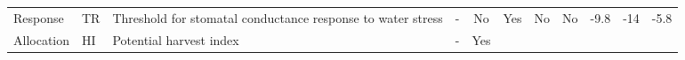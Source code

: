 \documentclass[a4paper]{article}
\begin{document}
\begin{longtable}[]{@{}llllccccrrr@{}}
\begin{minipage}[t]{0.08\columnwidth}
Response\strut
\end{minipage} & \begin{minipage}[t]{0.05\columnwidth}\raggedright\strut
TR\strut
\end{minipage} & \begin{minipage}[t]{0.19\columnwidth}\raggedright\strut
Threshold for stomatal conductance response to water stress\strut
\end{minipage} & \begin{minipage}[t]{0.06\columnwidth}\raggedright\strut
-\strut
\end{minipage} & \begin{minipage}[t]{0.06\columnwidth}\centering\strut
No\strut
\end{minipage} & \begin{minipage}[t]{0.08\columnwidth}\centering\strut
Yes\strut
\end{minipage} & \begin{minipage}[t]{0.05\columnwidth}\centering\strut
No\strut
\end{minipage} & \begin{minipage}[t]{0.04\columnwidth}\centering\strut
No\strut
\end{minipage} & \begin{minipage}[t]{0.04\columnwidth}\raggedleft\strut
-9.8\strut
\end{minipage} & \begin{minipage}[t]{0.04\columnwidth}\raggedleft\strut
-14\strut
\end{minipage} & \begin{minipage}[t]{0.04\columnwidth}\raggedleft\strut
-5.8\strut
\end{minipage}\tabularnewline
\begin{minipage}[t]{0.08\columnwidth}\raggedright\strut
Allocation\strut
\end{minipage} & \begin{minipage}[t]{0.05\columnwidth}\raggedright\strut
HI\strut
\end{minipage} & \begin{minipage}[t]{0.19\columnwidth}\raggedright\strut
Potential harvest index\strut
\end{minipage} & \begin{minipage}[t]{0.06\columnwidth}\raggedright\strut
-\strut
\end{minipage} & \begin{minipage}[t]{0.06\columnwidth}\centering\strut
Yes\strut
\end{minipage} & \begin{minipage}[t]{0.08\columnwidth}\centering\strut

\end{minipage}
\end{longtable}
\end{document}
